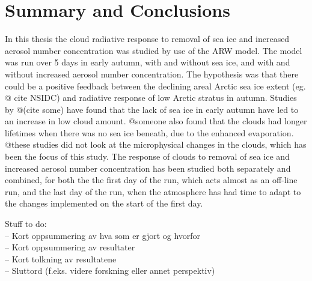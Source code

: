 \chapter{Summary and Conclusions}
\label{chap:summaryconclusions}
In this thesis the cloud radiative response to removal of sea ice and increased aerosol number concentration was studied by use of the ARW model. The model was run over 5 days in early autumn, with and without sea ice, and with and without increased aerosol number concentration. The hypothesis was that there could be a positive feedback between the declining areal Arctic sea ice extent (eg. @ cite NSIDC) and radiative response of low Arctic stratus in autumn. Studies by @(cite some) have found that the lack of sea ice in early autumn have led to an increase in low cloud amount. @someone also found that the clouds had longer lifetimes when there was no sea ice beneath, due to the enhanced evaporation. @these studies did not look at the microphysical changes in the clouds, which has been the focus of this study. The response of clouds to removal of sea ice and increased aerosol number concentration has been studied both separately and combined, for both the the first day of the run, which acts almost as an off-line run, and the last day of the run, when the atmosphere has had time to adapt to the changes implemented on the start of the first day.


Stuff to do:\\
-- Kort oppsummering av hva som er gjort og hvorfor\\
-- Kort oppsummering av resultater\\
-- Kort tolkning av resultatene\\
-- Sluttord (f.eks. videre forskning eller annet perspektiv)
